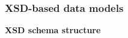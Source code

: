 \subsubsection{XSD-based data models}\label{sec:xsd-based-data-models}



\noindent\textbf{XSD schema structure}




